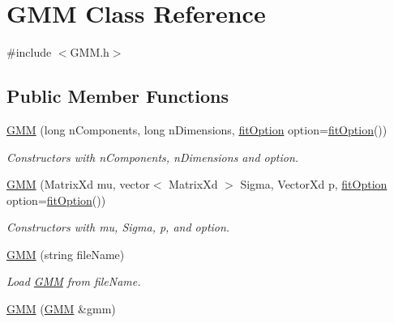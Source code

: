 \hypertarget{class_g_m_m}{\section{G\+M\+M Class Reference}
\label{class_g_m_m}
}


{\ttfamily \#include $<$G\+M\+M.\+h$>$}

\subsection*{Public Member Functions}
\begin{DoxyCompactItemize}
\item 
\hypertarget{class_g_m_m_a780eb798b963d64324e60f8a05511793}{\hyperlink{class_g_m_m_a780eb798b963d64324e60f8a05511793}{G\+M\+M} (long n\+Components, long n\+Dimensions, \hyperlink{structfit_option}{fit\+Option} option=\hyperlink{structfit_option}{fit\+Option}())}\label{class_g_m_m_a780eb798b963d64324e60f8a05511793}

\begin{DoxyCompactList}\small\item\em Constructors with n\+Components, n\+Dimensions and option. \end{DoxyCompactList}\item 
\hypertarget{class_g_m_m_a204c0939ce8e0544a70f6bacac70430e}{\hyperlink{class_g_m_m_a204c0939ce8e0544a70f6bacac70430e}{G\+M\+M} (Matrix\+Xd mu, vector$<$ Matrix\+Xd $>$ Sigma, Vector\+Xd p, \hyperlink{structfit_option}{fit\+Option} option=\hyperlink{structfit_option}{fit\+Option}())}\label{class_g_m_m_a204c0939ce8e0544a70f6bacac70430e}

\begin{DoxyCompactList}\small\item\em Constructors with mu, Sigma, p, and option. \end{DoxyCompactList}\item 
\hypertarget{class_g_m_m_a3fd2ad1e4b02532fbcc8c268f60b4ee8}{\hyperlink{class_g_m_m_a3fd2ad1e4b02532fbcc8c268f60b4ee8}{G\+M\+M} (string file\+Name)}\label{class_g_m_m_a3fd2ad1e4b02532fbcc8c268f60b4ee8}

\begin{DoxyCompactList}\small\item\em Load \hyperlink{class_g_m_m}{G\+M\+M} from file\+Name. \end{DoxyCompactList}\item 
\hypertarget{class_g_m_m_ae4a3fdfee01a1f37a58d405b701f1469}{\hyperlink{class_g_m_m_ae4a3fdfee01a1f37a58d405b701f1469}{G\+M\+M} (\hyperlink{class_g_m_m}{G\+M\+M} \&gmm)}\label{class_g_m_m_ae4a3fdfee01a1f37a58d405b701f1469}


\end{DoxyCompactItemize}
